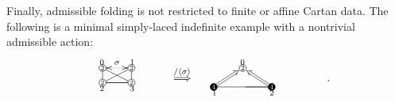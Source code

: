 \documentclass[12pt, leqno]{amsart}
\numberwithin{equation}{section}
\theoremstyle{plain}
\theoremstyle{definition}
\newcommand*\circled[1]{ \fontsize{6}{6}\selectfont \tikz[baseline=(char.base)]{
  \node[shape=circle,draw,inner sep=0.4pt] (char) {#1};} \fontsize{12}{12}\selectfont }
\newcommand*\bcircled[1]{\fontsize{6}{6}\selectfont \tikz[baseline=(char.base)]{
    \node[shape=circle, fill= black, draw=black, text=white,  inner sep=0.4pt] (char) {#1};} \fontsize{12}{12}\selectfont}
\newcommand{\ang}[1]{\langle#1\rangle}
\begin{document}
Finally, admissible folding is not restricted to finite or affine
Cartan data.  The following is a minimal simply-laced indefinite
example with a nontrivial admissible action:
\begin{align} \label{eq: indefinite folding}
\raisebox{1.2em}{
\xymatrix@R=1.5ex@C=4.5ex{
*{\circled{2}}<3pt>
   \ar@{-}[d]
   \ar@{}[r]^>{0\qquad \qquad \ \ }
   \ar@{-}[dr]
   \ar@{<.>}[r]^{\sigma}
&
*{\circled{2}}<3pt>
   \ar@{-}[dl]
   \ar@{-}[d]
   \ar@{}[l]_>{\qquad \qquad \ \  1}
\\
*{\circled{2}}<3pt>
   \ar@{-}[r]_>{2\qquad \qquad \ \ }
&
*{\circled{2}}<3pt>
   \ar@{-}[l]^>{ \qquad \qquad \ \ 3}
}}
\quad
&\overset{/\ang{\sigma}}{\Longrightarrow}
\quad
\raisebox{1.2em}{
\xymatrix@R=2.2ex@C=4.5ex{
&
*{\circled{2}}<3pt>
   \ar@{}[r]^>{0\qquad\qquad \ \ }
&
\\
*{\bcircled{4}}<3pt>
   \ar@{=>}[ur]
 \ar@{-}[rr]_>{1\qquad\qquad\quad\qquad\qquad \ \ }
&&
*{\bcircled{4}}<3pt>
   \ar@{=>}[ul]
   \ar@{-}[l]^>{\qquad\qquad \ \ 2}
}}.
\end{align}
\end{document}
